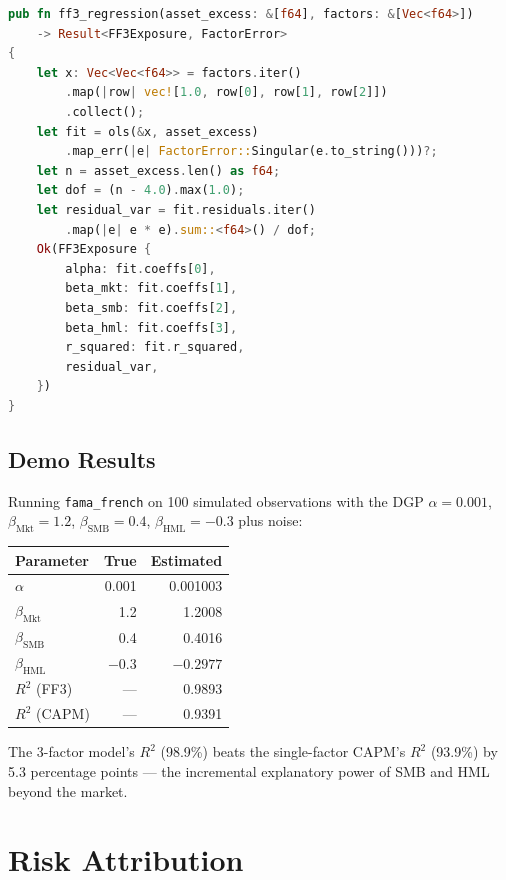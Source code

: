 \begin{lstlisting}[language=Rust, caption={FF3 regression via the OLS machinery.}]
pub fn ff3_regression(asset_excess: &[f64], factors: &[Vec<f64>])
    -> Result<FF3Exposure, FactorError>
{
    let x: Vec<Vec<f64>> = factors.iter()
        .map(|row| vec![1.0, row[0], row[1], row[2]])
        .collect();
    let fit = ols(&x, asset_excess)
        .map_err(|e| FactorError::Singular(e.to_string()))?;
    let n = asset_excess.len() as f64;
    let dof = (n - 4.0).max(1.0);
    let residual_var = fit.residuals.iter()
        .map(|e| e * e).sum::<f64>() / dof;
    Ok(FF3Exposure {
        alpha: fit.coeffs[0],
        beta_mkt: fit.coeffs[1],
        beta_smb: fit.coeffs[2],
        beta_hml: fit.coeffs[3],
        r_squared: fit.r_squared,
        residual_var,
    })
}
\end{lstlisting}

\subsection{Demo Results}

Running \texttt{fama\_french} on 100 simulated observations with the
DGP $\alpha = 0.001$, $\beta_{\text{Mkt}} = 1.2$,
$\beta_{\text{SMB}} = 0.4$, $\beta_{\text{HML}} = -0.3$ plus noise:

\begin{center}
\begin{tabular}{lrr}
\toprule
Parameter & True & Estimated \\
\midrule
$\alpha$ & 0.001 & 0.001003 \\
$\beta_{\text{Mkt}}$ & 1.2 & 1.2008 \\
$\beta_{\text{SMB}}$ & 0.4 & 0.4016 \\
$\beta_{\text{HML}}$ & $-0.3$ & $-0.2977$ \\
$R^2$ (FF3) & --- & 0.9893 \\
$R^2$ (CAPM) & --- & 0.9391 \\
\bottomrule
\end{tabular}
\end{center}

The 3-factor model's $R^2$ (98.9\%) beats the single-factor CAPM's
$R^2$ (93.9\%) by 5.3 percentage points --- the incremental explanatory
power of SMB and HML beyond the market.

\section{Risk Attribution}

